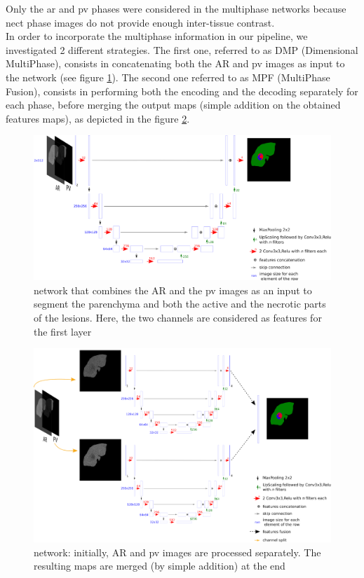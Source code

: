 Only the \ac{ar} and \ac{pv} phases were considered in the
multiphase networks because \ac{nect} phase images do not provide enough
inter-tissue contrast. \\
In order to incorporate the multiphase information in our pipeline, we
investigated 2 different strategies. The first one, referred to as DMP (Dimensional MultiPhase), consists in concatenating both the
AR and \ac{pv} images as input to the network (see figure \ref{CARS_DMP_Full_Fig}).
The second one referred to as MPF (MultiPhase Fusion), consists
in performing both the encoding and the decoding separately for each
phase, before merging the output maps (simple addition on the obtained
features maps), as depicted in the figure \ref{CARS_MPF_Full_Fig}.

\begin{figure}[th!]
	\centering
	\includegraphics[width=0.9\linewidth]{../SemanticSeg/images/image28}
	\caption{ network that combines the AR and the \ac{pv} images as an input to segment the parenchyma and both the active and the necrotic parts of the lesions. Here, the two channels are considered as features for the first layer}
	\label{CARS_DMP_Full_Fig}
\end{figure}


\begin{figure}[th!]
	\centering
	\includegraphics[width=0.9\linewidth]{../SemanticSeg/images/image36}
	\caption{ network: initially, AR and \ac{pv} images are processed separately. The resulting maps are merged (by simple addition) at the end}
	\label{CARS_MPF_Full_Fig}
\end{figure}



